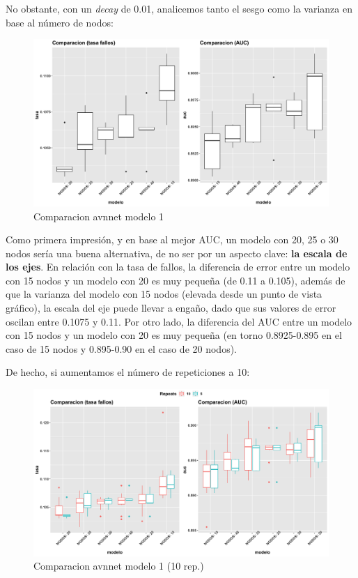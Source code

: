 \documentclass[
]{article}
\begin{document}
No obstante, con un \emph{decay} de 0.01, analicemos tanto el sesgo como
la varianza en base al número de nodos:

\begin{figure}[h!]

{\centering \includegraphics[width=0.99\linewidth,height=0.99\textheight,]{./charts/02_comparacion_tasa_auc_modelo1} 

}

\caption{Comparacion avnnet modelo 1}\label{fig:unnamed-chunk-52}
\end{figure}

Como primera impresión, y en base al mejor AUC, un modelo con 20, 25 o
30 nodos sería una buena alternativa, de no ser por un aspecto clave:
\textbf{la escala de los ejes}. En relación con la tasa de fallos, la
diferencia de error entre un modelo con 15 nodos y un modelo con 20 es
muy pequeña (de 0.11 a 0.105), además de que la varianza del modelo con
15 nodos (elevada desde un punto de vista gráfico), la escala del eje
puede llevar a engaño, dado que sus valores de error oscilan entre
0.1075 y 0.11. Por otro lado, la diferencia del AUC entre un modelo con
15 nodos y un modelo con 20 es muy pequeña (en torno 0.8925-0.895 en el
caso de 15 nodos y 0.895-0.90 en el caso de 20 nodos).

De hecho, si aumentamos el número de repeticiones a 10:

\begin{figure}[h!]

{\centering \includegraphics[width=0.99\linewidth,height=0.99\textheight,]{./charts/02_comparacion_tasa_auc_modelo1_10rep} 

}

\caption{Comparacion avnnet modelo 1 (10 rep.)}\label{fig:unnamed-chunk-53}
\end{figure}
\end{document}
